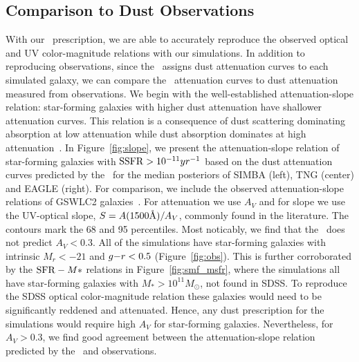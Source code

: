 \subsection{Comparison to Dust Observations} \label{sec:reproduce}
With our \eda~prescription, we are able to accurately reproduce the
observed optical and UV color-magnitude relations with our simulations. 
In addition to  reproducing observations, since the \eda~assigns dust
attenuation curves to each simulated galaxy, we can compare the
\eda~attenuation curves to dust attenuation measured from
observations. 
We begin with the well-established attenuation-slope relation: star-forming
galaxies with higher dust attenuation have shallower attenuation curves. 
This relation is a consequence of dust scattering dominating absorption at
low attenuation while dust absorption dominates at high
attenuation~\citep{gordon1994, witt2000, draine2003, chevallard2013}. 
In Figure~\ref{fig:slope}, we present the attenuation-slope relation of
star-forming galaxies with ${\rm SSFR} > 10^{-11}yr^{-1}$ based on the
dust attenuation curves predicted by the \eda~for the median posteriors of
SIMBA (left), TNG (center) and EAGLE (right).
For comparison, we include the observed attenuation-slope relations of
GSWLC2 galaxies~\citep[grey shaded;][]{salim2020}.
For attenuation we use $A_V$ and for slope we use the UV-optical slope, $S
= A(1500\AA)/A_V$, commonly found in the literature. 
The contours mark the 68 and 95 percentiles. 
Most noticably, we find that the \eda~does not predict $A_V < 0.3$. 
All of the simulations have star-forming galaxies with intrinsic $M_r <
-21$ and $g{-}r < 0.5$ (Figure~\ref{fig:obs}). 
This is further corroborated by the ${\rm SFR}-M*$ relations in
Figure~\ref{fig:smf_msfr}, where the simulations all have star-forming
galaxies with $M_* > 10^{11}M_\odot$, not found in SDSS. 
To reproduce the SDSS optical color-magnitude relation these galaxies would
need to be significantly reddened and attenuated. 
Hence, any dust prescription for the simulations would require high 
$A_V$ for star-forming galaxies.
Nevertheless, for $A_V > 0.3$, we find good agreement between the 
attenuation-slope relation predicted by the \eda~and observations. 

